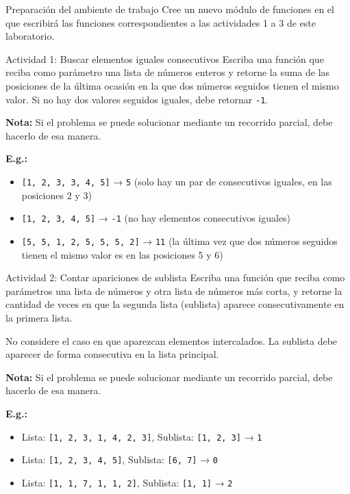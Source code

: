 \documentclass{ip-lab}
\begin{document}
\maketitle



\begin{sectionbox}{Preparación del ambiente de trabajo}
  Cree un nuevo módulo de funciones en el que escribirá las funciones correspondientes a las actividades 1 a 3 de este laboratorio.
\end{sectionbox}

\begin{sectionbox}{Actividad 1: Buscar elementos iguales consecutivos}
  Escriba una función que reciba como parámetro una lista de números enteros y retorne la suma de las posiciones de la última ocasión en la que dos números seguidos tienen el mismo valor. Si no hay dos valores seguidos iguales, debe retornar \texttt{-1}.

  \textbf{Nota:} Si el problema se puede solucionar mediante un recorrido parcial, debe hacerlo de esa manera.

  \textbf{E.g.:}
  \begin{itemize}
      \item \texttt{[1, 2, 3, 3, 4, 5]} → \texttt{5} (solo hay un par de consecutivos iguales, en las posiciones 2 y 3)
      \item \texttt{[1, 2, 3, 4, 5]} → \texttt{-1} (no hay elementos consecutivos iguales)
      \item \texttt{[5, 5, 1, 2, 5, 5, 5, 2]} → \texttt{11} (la última vez que dos números seguidos tienen el mismo valor es en las posiciones 5 y 6)
  \end{itemize}
\end{sectionbox}

\begin{sectionbox}{Actividad 2: Contar apariciones de sublista}
  Escriba una función que reciba como parámetros una lista de números y otra lista de números más corta, y retorne la cantidad de veces en que la segunda lista (sublista) aparece consecutivamente en la primera lista.

  No considere el caso en que aparezcan elementos intercalados. La sublista debe aparecer de forma consecutiva en la lista principal. 

  \textbf{Nota:} Si el problema se puede solucionar mediante un recorrido parcial, debe hacerlo de esa manera.
  
  \textbf{E.g.:}
  \begin{itemize}
      \item Lista: \texttt{[1, 2, 3, 1, 4, 2, 3]}, Sublista: \texttt{[1, 2, 3]} → \texttt{1}
      \item Lista: \texttt{[1, 2, 3, 4, 5]}, Sublista: \texttt{[6, 7]} → \texttt{0}
      \item Lista: \texttt{[1, 1, 7, 1, 1, 2]}, Sublista: \texttt{[1, 1]} → \texttt{2}
  \end{itemize}
\end{sectionbox}
\end{document}
